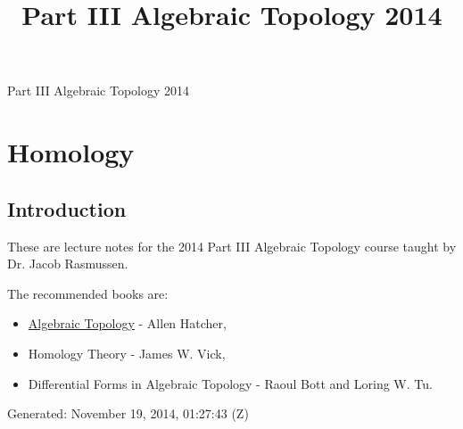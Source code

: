 \documentclass[10pt,]{book}
\title{Part III Algebraic Topology 2014}
\author{}
\date{}
\theoremstyle{plain}
\theoremstyle{definition}
\numberwithin{equation}{section}
\begin{document}
\frontmatter
\thispagestyle{empty}
\begin{center}
{\Huge Part III Algebraic Topology 2014}
\end{center}\par
{}
\clearpage
\thispagestyle{empty}
\clearpage
\maketitle
\clearpage
\thispagestyle{empty}
\clearpage
\setcounter{tocdepth}{1}
\renewcommand*\contentsname{Contents}
\tableofcontents
\mainmatter
\typeout{************************************************}
\typeout{************************************************}
\chapter[Homology]{Homology}\label{chapter-1}
\typeout{************************************************}
\typeout{************************************************}
\section[Introduction]{Introduction}\label{section-1}

          These are lecture notes for the 2014 Part III Algebraic Topology course taught by Dr. Jacob Rasmussen.
\par

          The recommended books are:
          \begin{itemize}
\item{}\href{http://www.math.cornell.edu/~hatcher/AT/ATpage.html}{Algebraic Topology} - Allen Hatcher,\item{}Homology Theory - James W. Vick,\item{}Differential Forms in Algebraic Topology - Raoul Bott and Loring W. Tu.\end{itemize}

\par

          Generated: November 19, 2014, 01:27:43 (Z)
\typeout{************************************************}
\typeout{************************************************}
\end{document}
